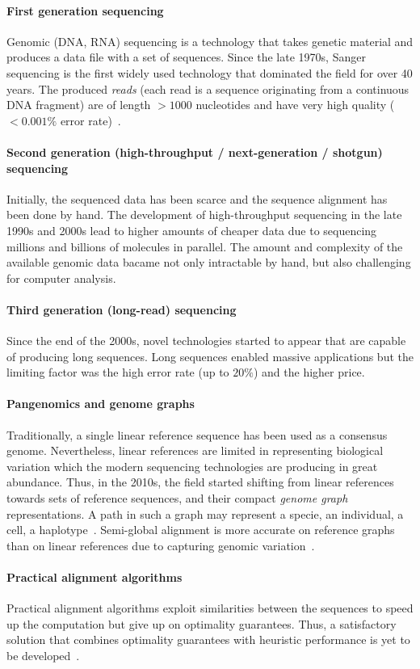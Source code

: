 \paragraph{First generation sequencing}
Genomic (DNA, RNA) sequencing is a technology that takes genetic material and
produces a data file with a set of sequences. Since the late 1970s, Sanger
sequencing is the first widely used technology that dominated the field for over
40 years. The produced \emph{reads} (each read is a sequence originating from a
continuous DNA fragment) are of length ${>}1000$ nucleotides and have very high
quality (${<}0.001\%$ error rate)~\citep{shendure2008next}.

\paragraph{Second generation (high-throughput / next-generation / shotgun) sequencing}
Initially, the sequenced data has been scarce and the sequence alignment has
been done by hand. The development of high-throughput sequencing in the late
1990s and 2000s lead to higher amounts of cheaper data due to sequencing
millions and billions of molecules in parallel. The amount and complexity of the
available genomic data bacame not only intractable by hand, but also challenging
for computer analysis.

\paragraph{Third generation (long-read) sequencing}
Since the end of the 2000s, novel technologies started to appear that are
capable of producing long sequences. Long sequences enabled massive applications
but the limiting factor was the high error rate (up to $20\%$) and the higher
price.

\paragraph{Pangenomics and genome graphs}
Traditionally, a single linear reference sequence has been used as a consensus
genome. Nevertheless, linear references are limited in representing biological
variation which the modern sequencing technologies are producing in great
abundance. Thus, in the 2010s, the field started shifting from linear references
towards sets of reference sequences, and their compact \emph{genome graph}
representations. A path in such a graph may represent a specie, an individual, a
cell, a haplotype~\cite{dilthey_improved_2015,paten_genome_2017}. Semi-global
alignment is more accurate on reference graphs than on linear references due to
capturing genomic variation~\citep{garrison_variation_2018}.

\paragraph{Practical alignment algorithms}
Practical alignment algorithms exploit similarities between the sequences to
speed up the computation but give up on optimality guarantees. Thus, a
satisfactory solution that combines optimality guarantees with heuristic
performance is yet to be developed~\citep{medvedev2022theoretical}.
